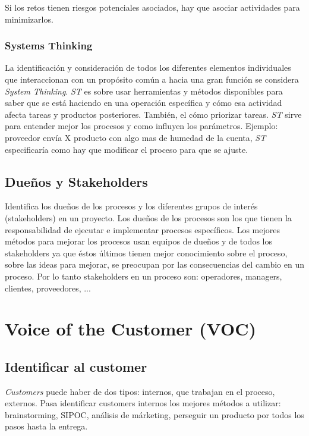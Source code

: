 \documentclass[oneside]{book}
\begin{document}
Si los retos tienen riesgos potenciales asociados, hay que asociar actividades para minimizarlos.

\subsection{Systems Thinking}

La identificación y consideración de todos los diferentes elementos individuales que interaccionan con un propósito común a hacia una gran función se considera \textit{System Thinking}. \textit{ST} es sobre usar herramientas y métodos disponibles para saber que se está haciendo en una operación específica y cómo esa actividad afecta tareas y productos posteriores. También, el cómo priorizar tareas. \newline \textit{ST} sirve para entender mejor los procesos y como influyen los parámetros. \newline Ejemplo: proveedor envía X producto con algo mas de humedad de la cuenta, \textit{ST} especificaría como hay que modificar el proceso para que se ajuste. 

\section{Dueños y Stakeholders}

Identifica los dueños de los procesos y los diferentes grupos de interés (stakeholders) en un proyecto.
Los dueños de los procesos son los que tienen la responsabilidad de ejecutar e implementar procesos específicos. Los mejores métodos para mejorar los procesos usan equipos de dueños y de todos los stakeholders ya que éstos últimos tienen mejor conocimiento sobre el proceso, sobre las ideas para mejorar, se preocupan por las consecuencias del cambio en un proceso. Por lo tanto stakeholders en un proceso son: operadores, managers, clientes, proveedores, ...

\chapter{Voice of the Customer (VOC)}

\section{Identificar al customer}
\textit{Customers} puede haber de dos tipos: internos, que trabajan en el proceso, externos. Pasa identificar customers internos los mejores métodos a utilizar: brainstorming, SIPOC, análisis de márketing, perseguir un producto por todos los pasos hasta la entrega.
\end{document}

